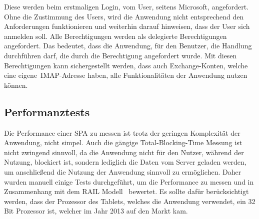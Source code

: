\newline
\newline
\raggedright
\normalsize
Diese werden beim erstmaligen Login, vom User, seitens Microsoft, angefordert.
Ohne die Zustimmung des Users, wird die Anwendung nicht entsprechend den Anforderungen funktionieren und weiterhin darauf hinweisen, dass der User sich anmelden soll.
Alle Berechtigungen werden als delegierte Berechtigungen angefordert.
Das bedeutet, dass die Anwendung, für den Benutzer, die Handlung durchführen darf, die durch die Berechtigung angefordert wurde.
Mit diesen Berechtigungen kann sichergestellt werden, dass auch Exchange-Konten, welche eine eigene~\gls{IMAP}-Adresse haben, alle Funktionalitäten der Anwendung nutzen können.
\subsection{Performanztests}\label{subsec:Pefromanztests}
Die Performance einer \gls{SPA} zu messen ist trotz der geringen Komplexität der Anwendung, nicht simpel.
Auch die gängige Total-Blocking-Time Messung ist nicht zwingend sinnvoll, da die Anwendung nicht für den Nutzer, während der Nutzung, blockiert ist, sondern lediglich die Daten vom Server geladen werden, um anschließend die Nutzung der Anwendung sinnvoll zu ermöglichen.
Daher wurden manuell einige Tests durchgeführt, um die Performance zu messen und in Zusammenhang mit dem RAIL Modell~\cite{RAILModell} bewertet.
Es sollte dafür berücksichtigt werden, dass der Prozessor des Tablets, welches die Anwendung verwendet, ein 32 Bit Prozessor ist, welcher im Jahr 2013 auf den Markt kam.
\newline
\newline
